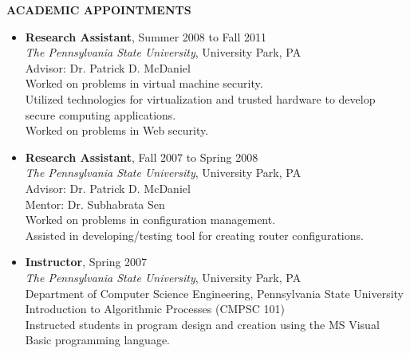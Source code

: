 \documentclass[10pt]{article}
\begin{document}
\vspace{1em} {\Large \textbf{ACADEMIC APPOINTMENTS}}
\begin{itemize}
\item \textbf{Research Assistant}, Summer 2008 to Fall 2011\\
  \textit{The Pennsylvania State University},
  University Park, PA\\
  Advisor: Dr. Patrick D. McDaniel\\
  Worked on problems in virtual machine security.\\
  Utilized technologies for virtualization and trusted hardware to develop secure computing applications.\\
  Worked on problems in Web security.

\item \textbf{Research Assistant}, Fall 2007 to Spring 2008\\
  \textit{The Pennsylvania State University},
  University Park, PA\\
  Advisor: Dr. Patrick D. McDaniel\\
  Mentor: Dr. Subhabrata Sen\\
  Worked on problems in configuration management.\\
  Assisted in developing/testing tool for creating router configurations.

\item \textbf{Instructor}, Spring 2007\\
  \textit{The Pennsylvania State University},
  University Park, PA\\
  Department of Computer Science Engineering, Pennsylvania State University\\
  Introduction to Algorithmic Processes (CMPSC 101)\\
  Instructed students in program design and creation using the MS Visual Basic programming language.
\end{itemize}
\end{document}
